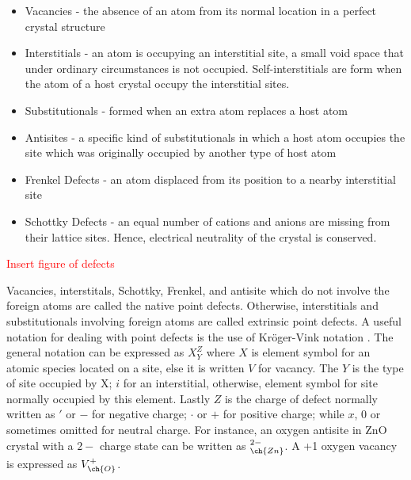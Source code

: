 \begin{itemize}
	\item Vacancies - the absence of an atom from its normal location in a perfect crystal structure
	\item Interstitials - an atom is occupying an interstitial site, a small void space that under ordinary circumstances is not occupied. Self-interstitials are form when the atom of a host crystal occupy the interstitial sites.
	\item Substitutionals - formed when an extra atom replaces a host atom
	\item Antisites - a specific kind of substitutionals in which a host atom occupies the site which was originally occupied by another type of host atom
	\item Frenkel Defects - an atom displaced from its position to a nearby interstitial site
	\item Schottky Defects - an equal  number  of  cations  and anions  are missing  from  their  lattice  sites. Hence,  electrical  neutrality  of  the  crystal is conserved. 

\end{itemize}

\textcolor{red}{Insert figure of defects}

Vacancies, interstitals, Schottky, Frenkel, and antisite which do not involve the foreign atoms are called the native point defects. Otherwise, interstitials and substitutionals involving foreign atoms are called extrinsic point defects. A useful notation for dealing with point defects is the use of  Kröger-Vink notation \citep{Kroeger1964}. The general notation can  be expressed as  $X_Y^Z$ where $X$ is element symbol for an atomic species located on a site, else it is written $V$ for vacancy. The $Y$ is the type of site occupied by X; $i$ for an interstitial, otherwise, element symbol for site normally occupied by this element. Lastly $Z$ is the charge of defect normally written as $'$ or $-$ for negative charge; $\cdot$ or $+$ for positive charge; while $x$, $0$ or sometimes omitted for neutral charge. For instance, an oxygen antisite in ZnO crystal with a $2-$ charge state can be written as $_{\ch{Zn}}^{2-}$. A +1 oxygen vacancy is expressed as $V_{\ch{O}}^{+}$.

